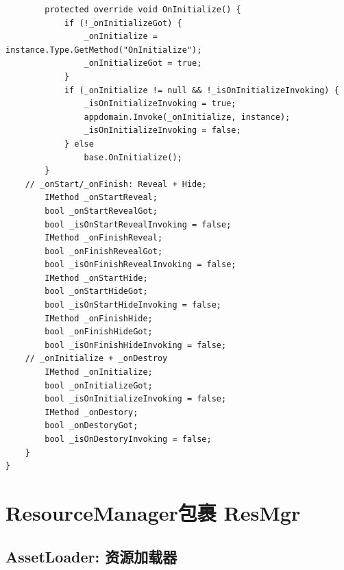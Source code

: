 \documentclass[9pt, b5paper]{article}
\begin{document}
\begin{verbatim}
        protected override void OnInitialize() {
            if (!_onInitializeGot) {
                _onInitialize = instance.Type.GetMethod("OnInitialize");
                _onInitializeGot = true;
            }
            if (_onInitialize != null && !_isOnInitializeInvoking) {
                _isOnInitializeInvoking = true;
                appdomain.Invoke(_onInitialize, instance);
                _isOnInitializeInvoking = false;
            } else 
                base.OnInitialize();
        }       
    // _onStart/_onFinish: Reveal + Hide;
        IMethod _onStartReveal;
        bool _onStartRevealGot;
        bool _isOnStartRevealInvoking = false;
        IMethod _onFinishReveal;
        bool _onFinishRevealGot;
        bool _isOnFinishRevealInvoking = false;
        IMethod _onStartHide;
        bool _onStartHideGot;
        bool _isOnStartHideInvoking = false;
        IMethod _onFinishHide;
        bool _onFinishHideGot;
        bool _isOnFinishHideInvoking = false;
    // _onInitialize + _onDestroy
        IMethod _onInitialize;
        bool _onInitializeGot;
        bool _isOnInitializeInvoking = false;
        IMethod _onDestory;
        bool _onDestoryGot;
        bool _isOnDestoryInvoking = false;
    }
}
\end{verbatim}


\section{ResourceManager包裹  ResMgr}
\label{sec-7}
\subsection{AssetLoader:  资源加载器}
\label{sec-7-1}
\end{document}
